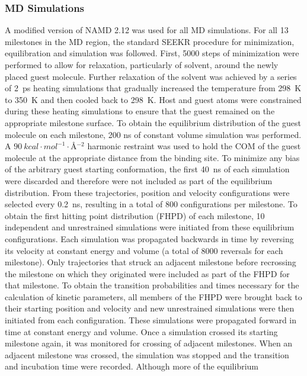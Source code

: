 \subsubsection*{MD Simulations}
\par A modified version of NAMD 2.12 was used for all MD simulations\cite{Phillips2005}.
For all 13 milestones in the MD region, the standard SEEKR procedure for 
minimization, equilibration and simulation was followed. First, 5000 steps of 
minimization were performed to allow for relaxation, particularly of solvent, 
around the newly placed guest molecule. Further relaxation of the solvent was 
achieved by a series of 2~ps heating simulations that gradually increased the 
temperature from 298~K to 350~K and then cooled back to 298~K. Host and guest atoms 
were constrained during these heating simulations to ensure that the guest 
remained on the appropriate milestone surface. To obtain the equilibrium 
distribution of the guest molecule on each milestone, 200 ns of constant 
volume simulation was performed. A $\SI{90}{kcal\cdot mol^{-1}\cdot\angstrom^{-2}}$ 
harmonic restraint was used to hold the COM of the guest molecule at the appropriate 
distance from the binding site. To minimize any bias of the arbitrary guest 
starting conformation, the first 40~ns of each simulation were discarded and 
therefore were not included as part of the equilibrium distribution. From these 
trajectories, position and velocity configurations were selected every 0.2~ns, 
resulting in a total of 800 configurations per milestone. To obtain the first
hitting point distribution (FHPD) of each milestone, 10 independent and 
unrestrained simulations were initiated from these equilibrium configurations. 
Each simulation was propagated backwards in time by reversing its velocity at 
constant energy and volume (a total of 8000 reversals for each milestone). 
Only trajectories that struck an adjacent milestone before recrossing the 
milestone on which they originated were included as part of the FHPD for that 
milestone. To obtain the transition probabilities and times necessary for the 
calculation of kinetic parameters, all members of the FHPD were brought back to 
their starting position and velocity and new unrestrained simulations were then 
initiated from each configuration. These simulations were propagated forward in 
time at constant energy and volume. Once a simulation crossed its starting 
milestone again, it was monitored for crossing of adjacent milestones. 
When an adjacent milestone was crossed, the simulation was stopped and the 
transition and incubation time were recorded. Although more of the equilibrium 
